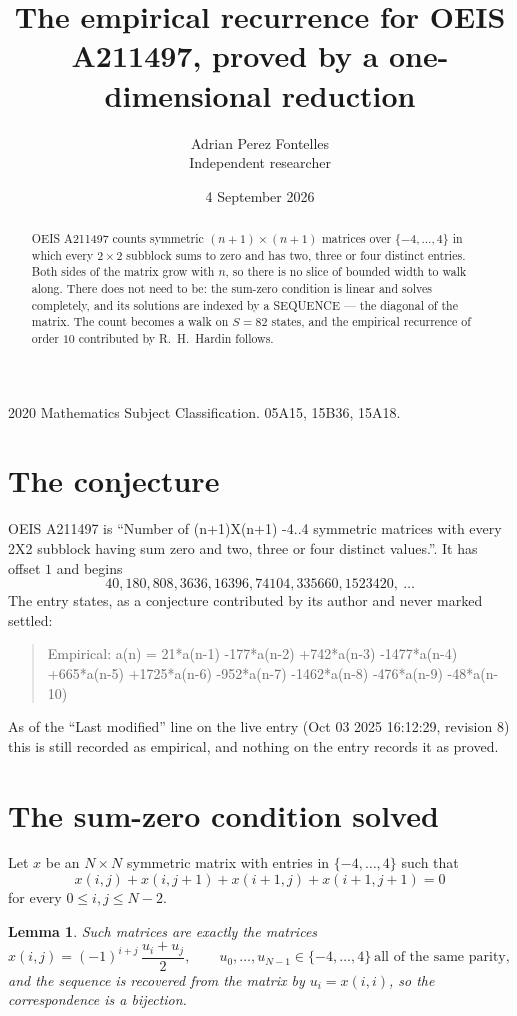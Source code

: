 \documentclass[11pt,a4paper]{article}
\title{The empirical recurrence for OEIS A211497, proved by a one-dimensional reduction}
\author{Adrian Perez Fontelles\\ \small Independent researcher}
\date{4 September 2026}
\theoremstyle{plain}
\newtheorem{lemma}[theorem]{Lemma}
\theoremstyle{definition}
\begin{document}
\maketitle

\begin{abstract}
OEIS A211497 counts symmetric $(n+1)\times(n+1)$ matrices over
$\{-4,\dots,4\}$ in which every $2\times2$ subblock sums to zero and has two, three or four distinct
entries. Both sides of the matrix grow with $n$, so there is no slice of bounded width to walk
along. There does not need to be: the sum-zero condition is linear and solves completely, and
its solutions are indexed by a SEQUENCE --- the diagonal of the matrix. The count becomes a walk
on $S=82$ states, and the empirical recurrence of order $10$ contributed by R.~H.~Hardin
follows.
\end{abstract}

\noindent\small 2020 Mathematics Subject Classification. 05A15, 15B36, 15A18.\normalsize

\section{The conjecture}

OEIS A211497 is ``Number of (n+1)X(n+1) -4..4 symmetric matrices with every 2X2 subblock having sum zero and two, three or four distinct values.''. It has offset $1$ and begins
\[
40, 180, 808, 3636, 16396, 74104, 335660, 1523420,\ \dots
\]
The entry states, as a conjecture contributed by its author and never marked settled:
\begin{quote}
Empirical: a(n) = 21*a(n-1) -177*a(n-2) +742*a(n-3) -1477*a(n-4) +665*a(n-5) +1725*a(n-6) -952*a(n-7) -1462*a(n-8) -476*a(n-9) -48*a(n-10)
\end{quote}
As of the ``Last modified'' line on the live entry (Oct 03 2025 16:12:29, revision 8) this is still
recorded as empirical, and nothing on the entry records it as proved.

\section{The sum-zero condition solved}

Let $x$ be an $N\times N$ symmetric matrix with entries in $\{-4,\dots,4\}$ such that
\[
x(i,j)+x(i,j{+}1)+x(i{+}1,j)+x(i{+}1,j{+}1)=0
\]
for every $0\le i,j\le N-2$.

\begin{lemma}\label{lem:solve}
Such matrices are exactly the matrices
\[
x(i,j)=(-1)^{i+j}\,\frac{u_i+u_j}{2},
\qquad u_0,\dots,u_{N-1}\in\{-4,\dots,4\}\ \text{all of the same parity},
\]
and the sequence is recovered from the matrix by $u_i=x(i,i)$, so the correspondence is a
bijection.
\end{lemma}
\end{document}

